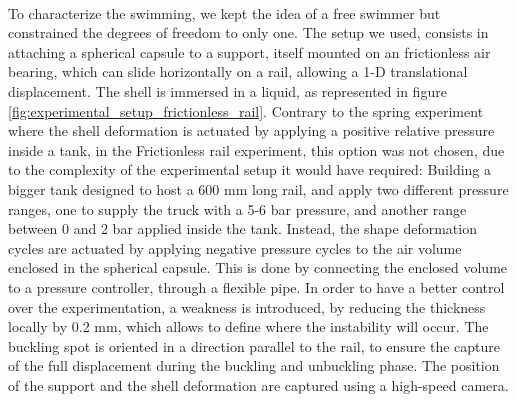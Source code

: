 \paragraph{}
To characterize the swimming, we kept the idea of a free swimmer but constrained the degrees of freedom to only one. The setup we used, consists in attaching a spherical capsule to a support, itself mounted on an frictionless air bearing, which can slide horizontally on a rail, allowing a 1-D translational displacement. The shell is immersed in a liquid, as represented in figure \ref{fig:experimental_setup_frictionless_rail}. Contrary to the spring experiment where the shell deformation is actuated by applying a positive relative pressure inside a tank, in the Frictionless rail experiment, this option was not chosen, due to the complexity of the experimental setup it would have required: Building a bigger tank designed to host a $600$ mm long rail, and apply two different pressure ranges, one to supply the truck with a 5-6 bar pressure, and another range between 0 and 2 bar applied inside the tank. Instead, the shape deformation cycles are actuated by applying negative pressure cycles to the air volume enclosed in the spherical capsule. This is done by connecting the enclosed volume to a pressure controller, through a flexible pipe. In order to have a better control over the experimentation, a weakness is introduced, by reducing the thickness locally by 0.2 mm, which allows to define where the instability will occur. The buckling spot is oriented in a direction parallel to the rail, to ensure the capture of the full displacement during the buckling and unbuckling phase. The position of the support and the shell deformation are captured using a high-speed camera. 

